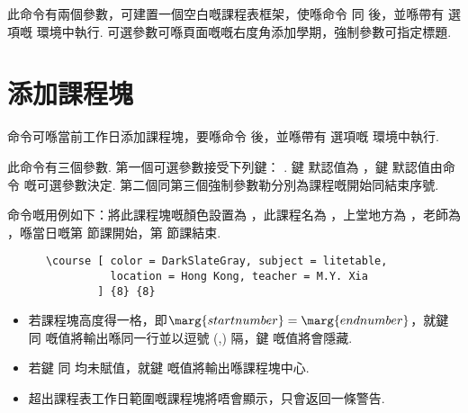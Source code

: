 \documentclass[letterpaper]{l3doc}
\begin{document}
\begin{function}{\maketable}
  \begin{syntax}
                
  \end{syntax}

  此命令有兩個參數，可建置一個空白嘅課程表框架，使喺命令  同  後，並喺帶有  選項嘅  環境中執行. 可選參數可喺頁面嘅嘅右度角添加學期，強制參數可指定標題.
\end{function}

\section{添加課程塊}

\begin{function}{\course}
  \begin{syntax}
  \end{syntax}

   命令可喺當前工作日添加課程塊，要喺命令  後，並喺帶有  選項嘅  環境中執行.
  
  此命令有三個參數. 第一個可選參數接受下列鍵：    . 鍵  默認值為 ，鍵  默認值由命令  嘅可選參數決定. 第二個同第三個強制參數勒分別為課程嘅開始同結束序號.
  
   命令嘅用例如下：將此課程塊嘅顏色設置為 ，此課程名為 ，上堂地方為 ，老師為 ，喺當日嘅第  節課開始，第  節課結束.

  \begin{framed}
    \begin{verbatim}
      \course [ color = DarkSlateGray, subject = litetable,
                location = Hong Kong, teacher = M.Y. Xia
              ] {8} {8}
    \end{verbatim}
  \end{framed}

\begin{itemize}[topsep = 0pt]
  \item 若課程塊高度得一格，即$\marg{start number} = \marg{end number}$，就鍵  同  嘅值將輸出喺同一行並以逗號 (,) 隔，鍵  嘅值將會隱藏.
  \item 若鍵  同  均未賦值，就鍵  嘅值將輸出喺課程塊中心.
  \item 超出課程表工作日範圍嘅課程塊將唔會顯示，只會返回一條警告.
\end{itemize}
\end{function}
\end{document}
